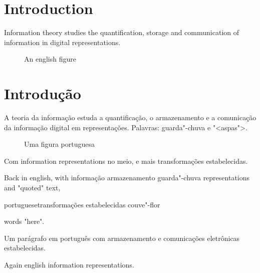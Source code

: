 \documentclass{article}
\begin{document}
\section{Introduction}
Information theory studies the quantification, storage and communication of information in digital representations.
\begin{figure}[h]
\caption{An english figure}
\end{figure}

\section{Introdução}
A teoria da informação estuda a quantificação, o armazenamento e a comunicação da informação digital em representações. Palavras: guarda"-chuva e "<aspas">.
\begin{figure}[h]
\caption{Uma figura portuguesa}
\end{figure}
Com \foreignlanguage{english}{information representations} no meio, e mais transformações estabelecidas.

Back in english, with \foreignlanguage{portuguese}{informação armazenamento guarda"-chuva} representations and "quoted" text,
\begin{otherlanguage*}{portuguese}transformações estabelecidas couve"-flor\end{otherlanguage*} words "here".
\begin{otherlanguage}{portuguese}
Um parágrafo em português com armazenamento e comunicações eletrônicas estabelecidas.
\begin{table}[h]
\caption{Uma tabela}
\end{table}
\end{otherlanguage}
Again english information representations.
\end{document}

